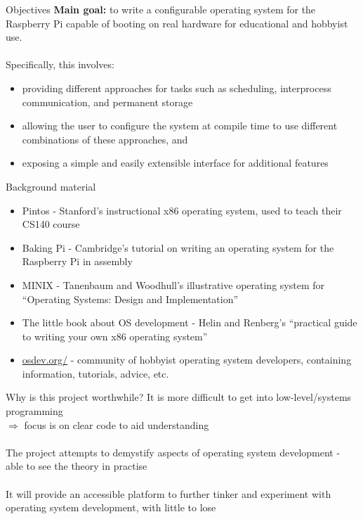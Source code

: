 \documentclass[10pt]{beamer}
\begin{document}
\begin{frame}{Objectives}
    \textbf{Main goal:}
    to write a configurable operating system for the Raspberry Pi capable of
    booting on real hardware for educational and hobbyist use. \\~\\

    Specifically, this involves:
    \begin{itemize}
        \item providing different approaches for tasks such as scheduling,
            interprocess communication, and permanent storage
        \item allowing the user to configure the system at compile time to use
            different combinations of these approaches, and
        \item exposing a simple and easily extensible interface for additional
            features
    \end{itemize}
\end{frame}

\begin{frame}{Background material}
    \begin{itemize}
        \item Pintos - Stanford's instructional x86 operating system, used to
            teach their CS140 course
        \item Baking Pi - Cambridge's tutorial on writing an operating system
            for the Raspberry Pi in assembly
        \item MINIX - Tanenbaum and Woodhull's illustrative operating system for
            ``Operating Systems: Design and Implementation''
        \item The little book about OS development - Helin and Renberg's
            ``practical guide to writing your own x86 operating system''
        \item \url{osdev.org/} - community of hobbyist operating system
            developers, containing information, tutorials, advice, etc.
    \end{itemize}
\end{frame}

\begin{frame}{Why is this project worthwhile?}
\centering
    It is more difficult to get into low-level/systems programming \\
    $\Rightarrow$ focus is on clear code to aid understanding \\~\\

    The project attempts to demystify aspects of operating system development -
    able to see the theory in practise \\~\\

    It will provide an accessible platform to further tinker and experiment with
    operating system development, with little to lose
\end{frame}
\end{document}
